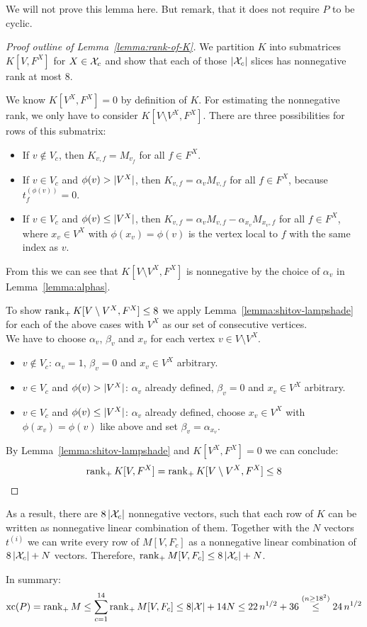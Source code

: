 We will not prove this lemma here. But remark, that it does not require $P$ to be cyclic.

\begin{proof}[Proof outline of Lemma~\ref{lemma:rank-of-K}]
  We partition $K$ into submatrices $K[V,F^X]$ for $X \in \mathcal{X}_c$ and show that each of those $\lvert\mathcal{X}_c\rvert$ slices has nonnegative rank at most $8$.

  We know $K[V^X,F^X] = 0$ by definition of $K$. For estimating the nonnegative rank, we only have to consider $K[V \setminus V^X, F^X]$. There are three possibilities for rows of this submatrix:

  \begin{itemize}
    \item If $v \notin V_c$, then $K_{v,f} = M_{v_f}$ for all $f \in F^X$.
    \item If $v \in V_c$ and $\phi(v) > \lvert V^X\rvert$, then $K_{v,f} = \alpha_v M_{v,f}$ for all $f \in F^X$, because $t_f^{(\phi(v))} = 0$.
    \item If $v \in V_c$ and $\phi(v) \leq \lvert V^X\rvert$, then $K_{v,f} = \alpha_v M_{v,f} - \alpha_{x_v} M_{x_v,f}$ for all $f \in F^X$, where $x_v \in V^X$ with $\phi(x_v) = \phi(v)$ is the vertex local to $f$ with the same index as $v$.
  \end{itemize}

  From this we can see that $K[V \setminus V^X, F^X]$ is nonnegative by the choice of $\alpha_v$ in Lemma~\ref{lemma:alphas}.

  To show $\operatorname{rank}_+ K[V \setminus V^X, F^X] \leq 8$ we apply Lemma~\ref{lemma:shitov-lampshade} for each of the above cases with $V^X$ as our set of consecutive vertices.\\
  We have to choose $\alpha_v$, $\beta_v$ and $x_v$ for each vertex $v \in V \setminus V^X$.

  \begin{itemize}
    \item $v \notin V_c$: $\alpha_v = 1$, $\beta_v = 0$ and $x_v \in V^X$ arbitrary.
    \item $v \in V_c$ and $\phi(v) > \lvert V^X\rvert$: $\alpha_v$ already defined, $\beta_v = 0$ and $x_v \in V^X$ arbitrary.
    \item $v \in V_c$ and $\phi(v) \leq \lvert V^X\rvert$: $\alpha_v$ already defined, choose $x_v \in V^X$ with $\phi(x_v) = \phi(v)$ like above and set $\beta_v = \alpha_{x_v}$.
  \end{itemize}

  By Lemma~\ref{lemma:shitov-lampshade} and $K[V^X,F^X] = 0$ we can conclude: $$\operatorname{rank}_+ K[V,F^X] = \operatorname{rank}_+ K[V \setminus V^X,F^X] \leq 8$$
\end{proof}

As a result, there are $8\,\lvert\mathcal{X}_c\rvert$ nonnegative vectors, such that each row of $K$ can be written as nonnegative linear combination of them. Together with the $N$ vectors $t^{(i)}$ we can write every row of $M[V,F_c]$ as a nonnegative linear combination of $8\,\lvert\mathcal{X}_c\rvert + N$ vectors. Therefore, $\operatorname{rank}_+ M[V,F_c] \leq 8\,\lvert\mathcal{X}_c\rvert + N$.

In summary: $$\operatorname{xc}(P) = \operatorname{rank}_+ M \leq \sum_{c=1}^{14} \operatorname{rank}_+ M[V,F_c] \leq 8\lvert\mathcal{X}\rvert + 14N \leq 22\,n^{1/2} + 36 \stackrel{(n \geq 18^2)}{\leq} 24\,n^{1/2}$$
